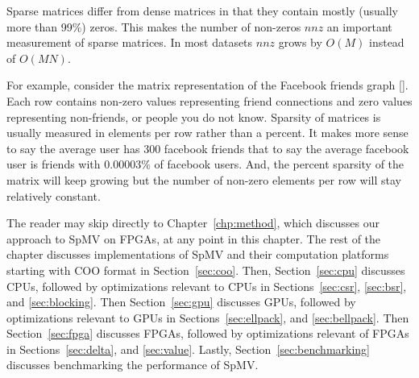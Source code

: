 \par Sparse matrices differ from dense matrices in that they contain mostly (usually more than 99\%) zeros. This makes the number of non-zeros $nnz$ an important measurement of sparse matrices. In most datasets $nnz$ grows by $O(M)$ instead of $O(MN)$.

For example, consider the matrix representation of the Facebook friends graph [\cite{prelim:zuckerburg}]. Each row contains non-zero values representing friend connections and zero values representing non-friends, or people you do not know. Sparsity of matrices is usually measured in elements per row rather than a percent. It makes more sense to say the average user has 300 facebook friends that to say the average facebook user is friends with 0.00003\% of facebook users. And, the percent sparsity of the matrix will keep growing but the number of non-zero elements per row will stay relatively constant.

The reader may skip directly to Chapter~\ref{chp:method}, which discusses our approach to SpMV on FPGAs, at any point in this chapter. The rest of the chapter discusses implementations of SpMV and their computation platforms starting with COO format in Section~\ref{sec:coo}. Then, Section~\ref{sec:cpu} discusses CPUs, followed by optimizations relevant to CPUs in Sections~\ref{sec:csr}, \ref{sec:bsr}, and \ref{sec:blocking}. Then Section~\ref{sec:gpu} discusses GPUs, followed by optimizations relevant to GPUs in Sections~\ref{sec:ellpack}, and \ref{sec:bellpack}. Then Section~\ref{sec:fpga} discusses FPGAs, followed by optimizations relevant of FPGAs in Sections~\ref{sec:delta}, and \ref{sec:value}. Lastly, Section~\ref{sec:benchmarking} discusses benchmarking the performance of SpMV.

